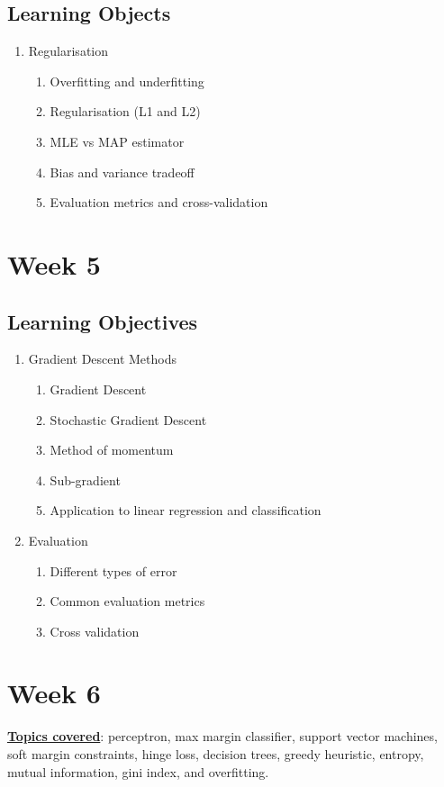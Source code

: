 \documentclass[11pt]{scrartcl}
\theoremstyle{definition}
\theoremstyle{remark}
\newcommand{\dfn}[1]{\textbf{\underline{#1}}}
\begin{document}
\subsection{Learning Objects}
\begin{enumerate}
	\item Regularisation 
	\begin{enumerate}[noitemsep]
		\item Overfitting and underfitting
		\item Regularisation (L1 and L2) 
		\item MLE vs MAP estimator 
		\item Bias and variance tradeoff 
		\item Evaluation metrics and cross-validation
	\end{enumerate}
\end{enumerate}

\section{Week 5}
\subsection{Learning Objectives}
\begin{enumerate}[noitemsep]
	\item Gradient Descent Methods 
	\begin{enumerate}[noitemsep]
		\item Gradient Descent 
		\item Stochastic Gradient Descent 
		\item Method of momentum 
		\item Sub-gradient 
		\item Application to linear regression and classification 
	\end{enumerate}
	\item Evaluation
	\begin{enumerate}[noitemsep]
		\item Different types of error 
		\item Common evaluation metrics
		\item Cross validation
	\end{enumerate}
\end{enumerate}
\section{Week 6}
\dfn{Topics covered}: perceptron, max margin classifier, support vector machines, soft margin constraints, hinge loss, decision trees, greedy heuristic, entropy, mutual information, gini index, and overfitting. 
\end{document}
